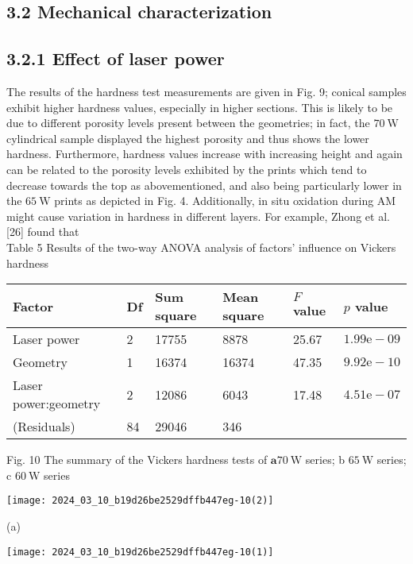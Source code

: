 \documentclass[10pt]{article}
\begin{document}
\subsection*{3.2 Mechanical characterization}
\subsection*{3.2.1 Effect of laser power}
The results of the hardness test measurements are given in Fig. 9; conical samples exhibit higher hardness values, especially in higher sections. This is likely to be due to different porosity levels present between the geometries; in fact, the $70 \mathrm{~W}$ cylindrical sample displayed the highest porosity and thus shows the lower hardness. Furthermore, hardness values increase with increasing height and again can be related to the porosity levels exhibited by the prints which tend to decrease towards the top as abovementioned, and also being particularly lower in the $65 \mathrm{~W}$ prints as depicted in Fig. 4. Additionally, in situ oxidation during AM might cause variation in hardness in different layers. For example, Zhong et al. [26] found that\\
Table 5 Results of the two-way ANOVA analysis of factors' influence on Vickers hardness

\begin{center}
\begin{tabular}{llllll}
\hline
Factor & Df & Sum square & Mean square & $F$ value & $p$ value \\
\hline
Laser power & 2 & 17755 & 8878 & 25.67 & $1.99 \mathrm{e}-09$ \\
Geometry & 1 & 16374 & 16374 & 47.35 & $9.92 \mathrm{e}-10$ \\
Laser power:geometry & 2 & 12086 & 6043 & 17.48 & $4.51 \mathrm{e}-07$ \\
(Residuals) & 84 & 29046 & 346 &  &  \\
\hline
\end{tabular}
\end{center}

Fig. 10 The summary of the Vickers hardness tests of $\mathbf{a} 70 \mathrm{~W}$ series; b $65 \mathrm{~W}$ series; c $60 \mathrm{~W}$ series

\begin{center}
\texttt{[image: 2024\_03\_10\_b19d26be2529dffb447eg-10(2)]}
\end{center}

(a)

\begin{center}
\texttt{[image: 2024\_03\_10\_b19d26be2529dffb447eg-10(1)]}
\end{center}
\end{document}
